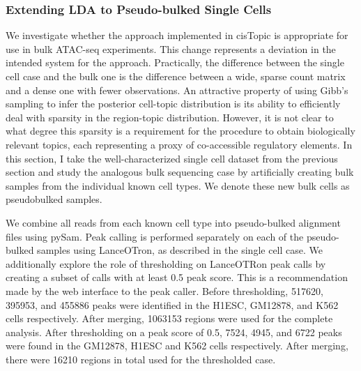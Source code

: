 \subsubsection{Extending LDA to Pseudo-bulked Single Cells}

We investigate whether the approach implemented in cisTopic is appropriate for use in bulk ATAC-seq experiments. This change represents a deviation in the intended system for the approach. Practically, the difference between the single cell case and the bulk one is the difference between a wide, sparse count matrix and a dense one with fewer observations. An attractive property of using Gibb's sampling to infer the posterior cell-topic distribution is its ability to efficiently deal with sparsity in the region-topic distribution. However, it is not clear to what degree this sparsity is a requirement for the procedure to obtain biologically relevant topics, each representing a proxy of co-accessible regulatory elements. In this section, I take the well-characterized single cell dataset from the previous section and study the analogous bulk sequencing case by artificially creating bulk samples from the individual known cell types. We denote these new bulk cells as pseudobulked samples.

We combine all reads from each known cell type into pseudo-bulked alignment files using pySam. Peak calling is performed separately on each of the pseudo-bulked samples using LanceOTron, as described in the single cell case. We additionally explore the role of thresholding on LanceOTRon peak calls by creating a subset of calls with at least 0.5 peak score. This is a recommendation made by the web interface to the peak caller. Before thresholding, 517620, 395953, and 455886 peaks were identified in the H1ESC, GM12878, and K562 cells respectively. After merging, 1063153 regions were used for the complete analysis. After thresholding on a peak score of 0.5, 7524, 4945, and 6722 peaks were found in the GM12878, H1ESC and K562 cells respectively. After merging, there were 16210 regions in total used for the thresholded case. 

